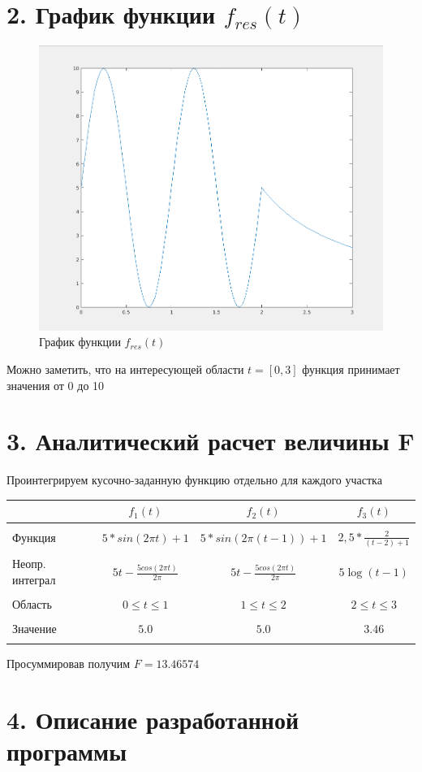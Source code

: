 \documentclass[12pt]{article}
\begin{document}
 \section*{2. График функции $f_{res}(t)$}%
 \begin{figure}[!h]
	\centering
	\includegraphics[width=0.5\linewidth]{func_graph.png}
	\caption{График функции $f_{res}(t)$}
\end{figure}
Можно заметить, что на интересующей области $t = [0,3]$ функция принимает значения от 0 до 10
 
 \section*{3. Аналитический расчет величины F}
Проинтегрируем кусочно-заданную функцию отдельно для каждого участка
\begin{center}
	\begin{tabular}[c]{lc|c|c}
  		& $f_1(t)$ & $f_2(t)$ & $f_3(t)$ \\[2mm]\hline
  		&&&\\
		Функция & $5*sin(2 \pi t) + 1$ & $5*sin(2 \pi (t-1)) + 1$ & $2,5* \frac{2}{(t-2) + 1}$\\
		&&&\\
		Неопр. интеграл & $5t - \frac{5cos(2 \pi t)}{2 \pi}$ & $5t - \frac{5cos(2 \pi t)}{2 \pi}$ & $5\log(t-1)$\\
		&&&\\
		Область & $0 \le t \le 1$ & $1 \le t \le 2$ & $2 \le t \le 3$\\
		&&&\\
		Значение & $5.0$ & $5.0$ & $3.46$\\\\
	\end{tabular}
\end{center}

Просуммировав получим $F = 13.46574$
 
\newpage
 \section*{4. Описание разработанной программы}
 
\end{document}
